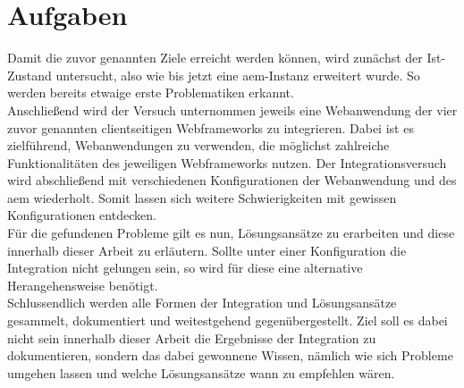 \section{Aufgaben}
Damit die zuvor genannten Ziele erreicht werden können, wird zunächst der Ist-Zustand untersucht, also wie bis jetzt eine \ac{aem}-Instanz erweitert wurde. So werden bereits etwaige erste Problematiken erkannt.\\
Anschließend wird der Versuch unternommen jeweils eine Webanwendung der vier zuvor genannten clientseitigen Webframeworks zu integrieren. Dabei ist es zielführend, Webanwendungen zu verwenden, die möglichst zahlreiche Funktionalitäten des jeweiligen Webframeworks nutzen. Der Integrationsversuch wird abschließend mit verschiedenen Konfigurationen der Webanwendung und des \ac{aem} wiederholt. Somit lassen sich weitere Schwierigkeiten mit gewissen Konfigurationen entdecken. \\
Für die gefundenen Probleme gilt es nun, Lösungsansätze zu erarbeiten und diese innerhalb dieser Arbeit zu erläutern. Sollte unter einer Konfiguration die Integration nicht gelungen sein, so wird für diese eine alternative Herangehensweise benötigt.\\
Schlussendlich werden alle Formen der Integration und Lösungsansätze gesammelt, dokumentiert und weitestgehend gegenübergestellt. Ziel soll es dabei nicht sein innerhalb dieser Arbeit die Ergebnisse der Integration zu dokumentieren, sondern das dabei gewonnene Wissen, nämlich wie sich Probleme umgehen lassen und welche Lösungsansätze wann zu empfehlen wären.